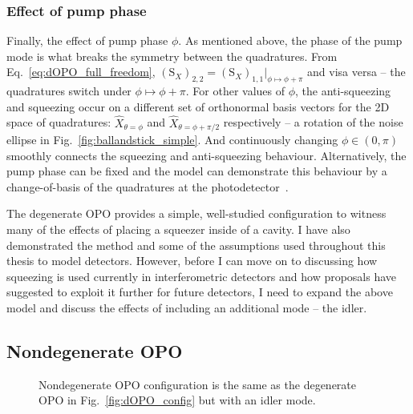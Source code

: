 \subsubsection{Effect of pump phase}

Finally, the effect of pump phase $\phi$. As mentioned above, the phase of the pump mode is what breaks the symmetry between the quadratures. From Eq.~\ref{eq:dOPO_full_freedom}, $(\text{S}_X)_{2,2}=(\text{S}_X)_{1,1}|_{\phi\mapsto\phi+\pi}$ and visa versa -- the quadratures switch under $\phi\mapsto\phi+\pi$. For other values of $\phi$, the anti-squeezing and squeezing occur on a different set of orthonormal basis vectors for the 2D space of quadratures: $\hat{X}_{\theta=\phi}$ and $\hat{X}_{\theta=\phi+\pi/2}$ respectively  -- a rotation of the noise ellipse in Fig.~\ref{fig:ballandstick_simple}. And continuously changing $\phi\in(0,\pi)$  smoothly connects the squeezing and anti-squeezing behaviour. Alternatively, the pump phase can be fixed and the model can demonstrate this behaviour by a change-of-basis of the quadratures at the photodetector~\cite{}.


The degenerate OPO provides a simple, well-studied configuration to witness many of the effects of placing a squeezer inside of a cavity. I have also demonstrated the method and some of the assumptions used throughout this thesis to model detectors. However, before I can move on to discussing how squeezing is used currently in interferometric detectors and how proposals have suggested to exploit it further for future detectors, I need to expand the above model and discuss the effects of including an additional mode -- the idler.


\subsection{Nondegenerate OPO}

\begin{figure}
	\centering
	\caption{Nondegenerate OPO configuration is the same as the degenerate OPO in Fig.~\ref{fig:dOPO_config} but with an idler mode.}
	\label{fig:nOPO_config}
\end{figure}

